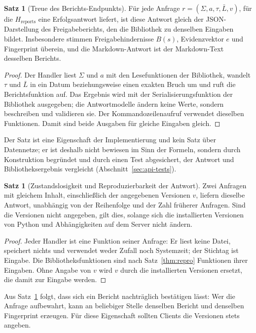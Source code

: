 \documentclass[a4paper,12pt]{article}
\theoremstyle{definition}
\newtheorem{satz}[definition]{Satz}
\begin{document}
\begin{satz}[Treue des Berichts-Endpunkts]\label{thm:api-fidelity}
Für jede Anfrage $r=(\Sigma,a,\tau,\bar L,v)$, für die $H_{\mathrm{reports}}$ eine Erfolgsantwort liefert, ist diese Antwort gleich der JSON-Darstellung des Freigabeberichts, den die Bibliothek zu denselben Eingaben bildet. Insbesondere stimmen Freigabehindernisse $B(s)$, Evidenzvektor $e$ und Fingerprint überein, und die Markdown-Antwort ist der Markdown-Text desselben Berichts.
\end{satz}
\begin{proof}
Der Handler liest $\Sigma$ und $a$ mit den Lesefunktionen der Bibliothek, wandelt $\tau$ und $\bar L$ in ein Datum beziehungsweise einen exakten Bruch um und ruft die Berichtsfunktion auf. Das Ergebnis wird mit der Serialisierungsfunktion der Bibliothek ausgegeben; die Antwortmodelle ändern keine Werte, sondern beschreiben und validieren sie. Der Kommandozeilenaufruf verwendet dieselben Funktionen. Damit sind beide Ausgaben für gleiche Eingaben gleich.
\end{proof}

Der Satz ist eine Eigenschaft der Implementierung und kein Satz über Datennetze; er ist deshalb nicht bewiesen im Sinn der Formeln, sondern durch Konstruktion begründet und durch einen Test abgesichert, der Antwort und Bibliotheksergebnis vergleicht (Abschnitt~\ref{sec:api-tests}).

\begin{satz}[Zustandslosigkeit und Reproduzierbarkeit der Antwort]\label{thm:api-stateless}
Zwei Anfragen mit gleichem Inhalt, einschließlich der angegebenen Versionen $v$, liefern dieselbe Antwort, unabhängig von der Reihenfolge und der Zahl früherer Anfragen. Sind die Versionen nicht angegeben, gilt dies, solange sich die installierten Versionen von Python und Abhängigkeiten auf dem Server nicht ändern.
\end{satz}
\begin{proof}
Jeder Handler ist eine Funktion seiner Anfrage: Er liest keine Datei, speichert nichts und verwendet weder Zufall noch Systemzeit; der Stichtag ist Eingabe. Die Bibliotheksfunktionen sind nach Satz~\ref{thm:repro} Funktionen ihrer Eingaben. Ohne Angabe von $v$ wird $v$ durch die installierten Versionen ersetzt, die damit zur Eingabe werden.
\end{proof}

Aus Satz~\ref{thm:api-stateless} folgt, dass sich ein Bericht nachträglich bestätigen lässt: Wer die Anfrage aufbewahrt, kann an beliebiger Stelle denselben Bericht und denselben Fingerprint erzeugen. Für diese Eigenschaft sollten Clients die Versionen stets angeben.
\end{document}
